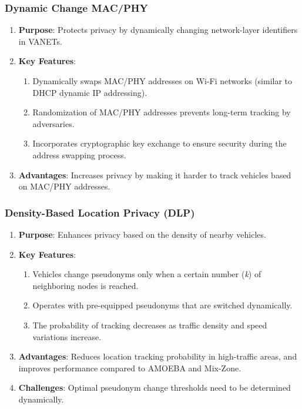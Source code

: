 \subsubsection{Dynamic Change MAC/PHY}
\begin{enumerate}
    \item \textbf{Purpose}: Protects privacy by dynamically changing network-layer identifiers in VANETs.
    \item \textbf{Key Features}:
    \begin{enumerate}
        \item Dynamically swaps MAC/PHY addresses on Wi-Fi networks (similar to DHCP dynamic IP addressing).
        \item Randomization of MAC/PHY addresses prevents long-term tracking by adversaries.
        \item Incorporates cryptographic key exchange to ensure security during the address swapping process.
    \end{enumerate}
    \item \textbf{Advantages}: Increases privacy by making it harder to track vehicles based on MAC/PHY addresses.
\end{enumerate}

\subsubsection{Density-Based Location Privacy (DLP)}
\begin{enumerate}
    \item \textbf{Purpose}: Enhances privacy based on the density of nearby vehicles.
    \item \textbf{Key Features}:
    \begin{enumerate}
        \item Vehicles change pseudonyms only when a certain number (\emph{k}) of neighboring nodes is reached.
        \item Operates with pre-equipped pseudonyms that are switched dynamically.
        \item The probability of tracking decreases as traffic density and speed variations increase.
    \end{enumerate}
    \item \textbf{Advantages}: Reduces location tracking probability in high-traffic areas, and improves performance compared to AMOEBA and Mix-Zone.
    \item \textbf{Challenges}: Optimal pseudonym change thresholds need to be determined dynamically.
\end{enumerate}

